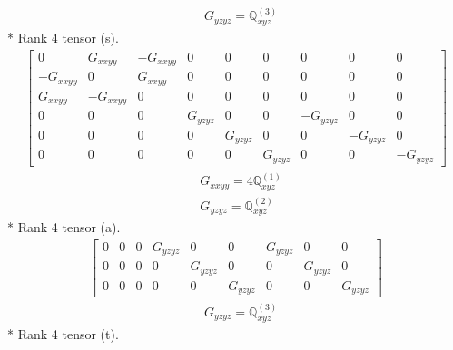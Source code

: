 \documentclass[fleqn,8pt,landscape]{jsarticle}
\begin{document}
\begin{align*}
& G_{yzyz} = \mathbb{Q}_{xyz}^{(3)}
\end{align*}
* Rank 4 tensor (s).
\begin{align*}
\begin{bmatrix} 0 & G_{xxyy} & - G_{xxyy} & 0 & 0 & 0 & 0 & 0 & 0 \\ - G_{xxyy} & 0 & G_{xxyy} & 0 & 0 & 0 & 0 & 0 & 0 \\ G_{xxyy} & - G_{xxyy} & 0 & 0 & 0 & 0 & 0 & 0 & 0 \\ 0 & 0 & 0 & G_{yzyz} & 0 & 0 & - G_{yzyz} & 0 & 0 \\ 0 & 0 & 0 & 0 & G_{yzyz} & 0 & 0 & - G_{yzyz} & 0 \\ 0 & 0 & 0 & 0 & 0 & G_{yzyz} & 0 & 0 & - G_{yzyz} \end{bmatrix}
\end{align*}
\begin{align*}
& G_{xxyy} = 4 \mathbb{Q}_{xyz}^{(1)} \\
& G_{yzyz} = \mathbb{Q}_{xyz}^{(2)}
\end{align*}
* Rank 4 tensor (a).
\begin{align*}
\begin{bmatrix} 0 & 0 & 0 & G_{yzyz} & 0 & 0 & G_{yzyz} & 0 & 0 \\ 0 & 0 & 0 & 0 & G_{yzyz} & 0 & 0 & G_{yzyz} & 0 \\ 0 & 0 & 0 & 0 & 0 & G_{yzyz} & 0 & 0 & G_{yzyz} \end{bmatrix}
\end{align*}
\begin{align*}
& G_{yzyz} = \mathbb{Q}_{xyz}^{(3)}
\end{align*}
* Rank 4 tensor (t).
\end{document}
